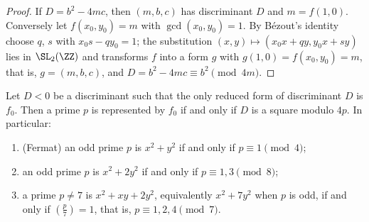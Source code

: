 \begin{proof}
If $D = b^2 - 4mc$, then $(m, b, c)$ has discriminant $D$ and $m = f(1, 0)$. Conversely let $f(x_0, y_0) = m$ with $\gcd(x_0, y_0) = 1$. By B\'ezout's identity choose $q$, $s$ with $x_0s - qy_0 = 1$; the
substitution $(x, y) \mapsto (x_0x + qy, y_0x + sy)$ lies in $\SL_2(\ZZ)$ and transforms $f$ into a form $g$ with $g(1, 0) = f(x_0, y_0) = m$, that is, $g = (m, b, c)$, and $D = b^2 - 4mc \equiv b^2 \pmod{4m}$.
\end{proof}

\begin{corollary}\label{number-theory:corollary-class-number-one}
Let $D < 0$ be a discriminant such that the only reduced form of discriminant $D$ is $f_0$. Then a prime $p$ is represented by $f_0$ if and only if $D$ is a square modulo $4p$. In particular:
\begin{enumerate}
\item (Fermat) an odd prime $p$ is $x^2 + y^2$ if and only if $p \equiv 1 \pmod 4$;
\item an odd prime $p$ is $x^2 + 2y^2$ if and only if $p \equiv 1, 3 \pmod 8$;
\item a prime $p \neq 7$ is $x^2 + xy + 2y^2$, equivalently $x^2 + 7y^2$ when $p$ is odd, if and only if $(\frac{p}{7}) = 1$, that is, $p \equiv 1, 2, 4 \pmod 7$.
\end{enumerate}
\end{corollary}

